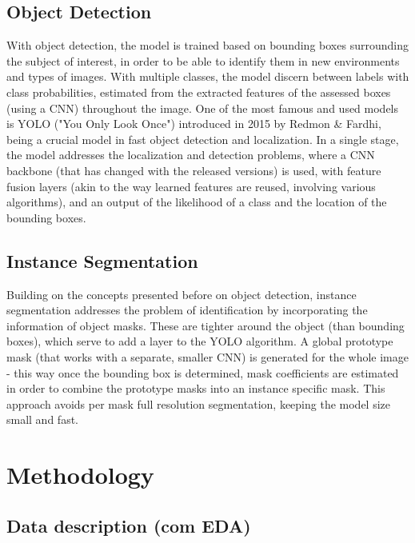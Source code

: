 \documentclass[conference]{IEEEtran}
\begin{document}
\subsection{Object Detection}

With object detection, the model is trained based on bounding boxes surrounding the subject of interest, in order to be able to identify them in new environments and types of images. With multiple classes, the model discern between labels with class probabilities, estimated from the extracted features of the assessed boxes (using a CNN) throughout the image. One of the most famous and used models is YOLO ("You Only Look Once") introduced in 2015 by Redmon \& Fardhi, being a crucial model in fast object detection and localization. In a single stage, the model addresses the localization and detection problems, where a CNN backbone (that has changed with the released versions) is used, with feature fusion layers (akin to the way learned features are reused, involving various algorithms), and an output of the likelihood of a class and the location of the bounding boxes.

\subsection{Instance Segmentation}

Building on the concepts presented before on object detection, instance segmentation addresses the problem of identification by incorporating the information of object masks. These are tighter around the object (than bounding boxes), which serve to add a layer to the YOLO algorithm. A global prototype mask (that works with a separate, smaller CNN) is generated for the whole image - this way once the bounding box is determined, mask coefficients are estimated in order to combine the prototype masks into an instance specific mask. This approach avoids per mask full resolution segmentation, keeping the model size small and fast.

\section{Methodology}

\subsection{Data description (com EDA)}
\end{document}
